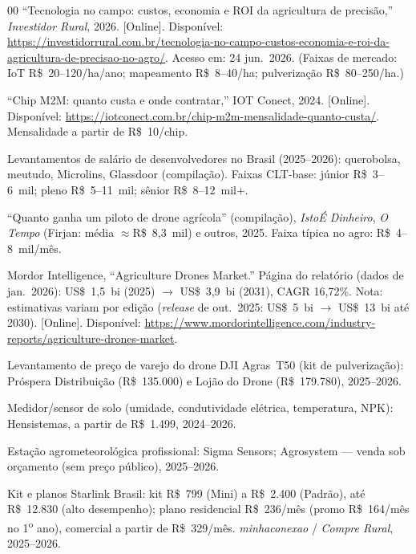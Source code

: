 \documentclass[conference]{IEEEtran}
\newcommand{\rs}{R\$}
\begin{document}
\begin{thebibliography}{00}
 ``Tecnologia no campo: custos, economia e ROI da agricultura de precisão,'' \textit{Investidor Rural}, 2026. [Online]. Disponível: \url{https://investidorrural.com.br/tecnologia-no-campo-custos-economia-e-roi-da-agricultura-de-precisao-no-agro/}. Acesso em: 24 jun.\ 2026. (Faixas de mercado: IoT \rs~20--120/ha/ano; mapeamento \rs~8--40/ha; pulverização \rs~80--250/ha.)

 ``Chip M2M: quanto custa e onde contratar,'' IOT Conect, 2024. [Online]. Disponível: \url{https://iotconect.com.br/chip-m2m-mensalidade-quanto-custa/}. Mensalidade a partir de \rs~10/chip.

 Levantamentos de salário de desenvolvedores no Brasil (2025--2026): querobolsa, meutudo, Microlins, Glassdoor (compilação). Faixas CLT-base: júnior \rs~3--6~mil; pleno \rs~5--11~mil; sênior \rs~8--12~mil$+$.

 ``Quanto ganha um piloto de drone agrícola'' (compilação), \textit{IstoÉ Dinheiro}, \textit{O Tempo} (Firjan: média $\approx$\rs~8,3~mil) e outros, 2025. Faixa típica no agro: \rs~4--8~mil/mês.

 Mordor Intelligence, ``Agriculture Drones Market.'' Página do relatório (dados de jan.\ 2026): US\$~1,5~bi (2025) $\to$ US\$~3,9~bi (2031), CAGR 16,72\%. Nota: estimativas variam por edição (\textit{release} de out.\ 2025: US\$~5~bi $\to$ US\$~13~bi até 2030). [Online]. Disponível: \url{https://www.mordorintelligence.com/industry-reports/agriculture-drones-market}.

 Levantamento de preço de varejo do drone DJI Agras~T50 (kit de pulverização): Próspera Distribuição (\rs~135.000) e Lojão do Drone (\rs~179.780), 2025--2026.

 Medidor/sensor de solo (umidade, condutividade elétrica, temperatura, NPK): Hensistemas, a partir de \rs~1.499, 2024--2026.

 Estação agrometeorológica profissional: Sigma Sensors; Agrosystem --- venda sob orçamento (sem preço público), 2025--2026.

 Kit e planos Starlink Brasil: kit \rs~799 (Mini) a \rs~2.400 (Padrão), até \rs~12.830 (alto desempenho); plano residencial \rs~236/mês (promo \rs~164/mês no 1\textsuperscript{o} ano), comercial a partir de \rs~329/mês. \textit{minhaconexao} / \textit{Compre Rural}, 2025--2026.

\end{thebibliography}
\end{document}
